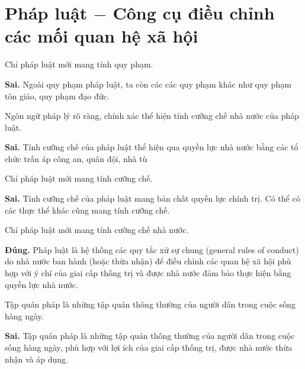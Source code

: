 \chapter{Pháp luật $-$ Công cụ điều chỉnh các mối quan hệ xã hội}
\begin{ques}
Chỉ pháp luật mới mang tính quy phạm.
\end{ques}
\begin{ans}
\textbf{Sai.} Ngoài quy phạm pháp luật, ta còn các các quy phạm khác như quy phạm tôn giáo, quy phạm đạo đức.
\end{ans}

\begin{ques}
Ngôn ngữ pháp lý rõ ràng, chính xác thể hiện tính cưỡng chế nhà nước của pháp luật.
\end{ques}
\begin{ans}
\textbf{Sai.} Tính cưỡng chế của pháp luật thể hiện qua quyền lực nhà nước bằng các tổ chức trấn áp công an, quân đội, nhà tù
\end{ans}

\begin{ques}
Chỉ pháp luật mới mang tính cưỡng chế.
\end{ques}
\begin{ans}
\textbf{Sai.} Tính cưỡng chế của pháp luật mang bản chất quyền lực chính trị. Có thể có các thực thể khác cũng mang tính cưỡng chế.
\end{ans}

\begin{ques}
Chỉ pháp luật mới mang tính cưỡng chế nhà nước.
\end{ques}
\begin{ans}
\textbf{Đúng.} Pháp luật là hệ thồng các quy tắc xử sự chung (general rules of conduct) do nhà nước ban hành (hoặc thừa nhận) để điều chỉnh các quan hệ xã hội phù hợp với ý chí của giai cấp thống trị và được nhà nước đảm bảo thực hiện bằng quyền lực nhà nước.
\end{ans}

\begin{ques}
Tập quán pháp là những tập quán thông thường của người dân trong cuộc sống hàng ngày.
\end{ques}
\begin{ans}
\textbf{Sai.} Tập quán pháp là những tập quán thông thường của người dân trong cuộc sống hàng ngày, phù hợp với lợi ích của giai cấp thống trị, được nhà nước thừa nhận và áp dụng.
\end{ans}

